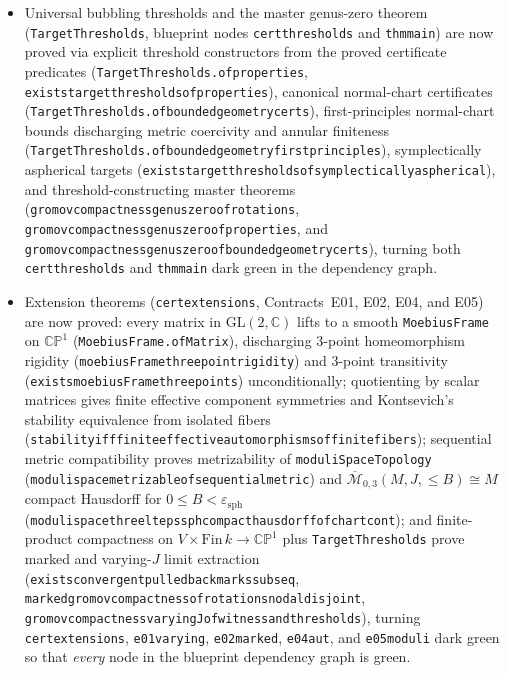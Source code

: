 \documentclass[11pt]{article}
\renewcommand{\_}{\origus\allowbreak}
\newcommand{\CP}{\mathbb{CP}^1}
\newcommand{\C}{\mathbb{C}}
\newcommand{\eps}{\varepsilon}
\newcommand{\code}[1]{\texttt{#1}}
\begin{document}
\begin{itemize}
  \code{isDefectSeq\_of\_concentration\_southern\_hemisphere}), and conformal M\"obius pullback
  pushforward (\code{weakMeasureConvergence\_map\_homeomorph},
  \code{concDefectCertificate\_of\_rotations}, \code{assemble\_prestable\_limit\_of\_rotations}, and
  \code{gromov\_compactness\_core\_of\_rotations}), turning \code{cert\_concdefect},
  \code{g01\_assemble}, and \code{g03\_core} dark green in the dependency graph.
\item Universal bubbling thresholds and the master genus-zero theorem (\code{TargetThresholds},
  blueprint nodes \code{cert\_thresholds} and \code{thm\_main}) are now proved via explicit threshold
  constructors from the proved certificate predicates (\code{TargetThresholds.of\_properties},
  \code{exists\_target\_thresholds\_of\_properties}), canonical normal-chart certificates
  (\code{TargetThresholds.of\_bounded\_geometry\_certs}), first-principles normal-chart bounds
  discharging metric coercivity and annular finiteness
  (\code{TargetThresholds.of\_bounded\_geometry\_first\_principles}), symplectically aspherical
  targets (\code{exists\_target\_thresholds\_of\_symplectically\_aspherical}), and threshold-constructing
  master theorems (\code{gromov\_compactness\_genus\_zero\_of\_rotations},
  \code{gromov\_compactness\_genus\_zero\_of\_properties}, and
  \code{gromov\_compactness\_genus\_zero\_of\_bounded\_geometry\_certs}), turning both
  \code{cert\_thresholds} and \code{thm\_main} dark green in the dependency graph.
\item Extension theorems (\code{cert\_extensions}, Contracts~E01, E02, E04, and E05) are now proved:
  every matrix in $\mathrm{GL}(2,\C)$ lifts to a smooth \code{MoebiusFrame} on $\CP$
  (\code{MoebiusFrame.ofMatrix}), discharging 3-point homeomorphism rigidity
  (\code{moebiusFrame\_three\_point\_rigidity}) and 3-point transitivity
  (\code{exists\_moebiusFrame\_three\_points}) unconditionally; quotienting by scalar matrices gives
  finite effective component symmetries and Kontsevich's stability equivalence from isolated fibers
  (\code{stability\_iff\_finite\_effective\_automorphisms\_of\_finite\_fibers}); sequential metric
  compatibility proves metrizability of \code{moduliSpaceTopology}
  (\code{moduli\_space\_metrizable\_of\_sequential\_metric}) and $\overline{\mathcal M}_{0,3}(M,J,\le B)\cong M$
  compact Hausdorff for $0\le B<\eps_{\mathrm{sph}}$
  (\code{moduli\_space\_three\_lt\_eps\_sph\_compact\_hausdorff\_of\_chart\_cont}); and finite-product
  compactness on $V\times\mathrm{Fin}\,k\to\CP$ plus \code{TargetThresholds} prove marked and
  varying-$J$ limit extraction (\code{exists\_convergent\_pulled\_back\_marks\_subseq},
  \code{marked\_gromov\_compactness\_of\_rotations\_nodal\_disjoint},
  \code{gromov\_compactness\_varying\_J\_of\_witness\_and\_thresholds}), turning
  \code{cert\_extensions}, \code{e01\_varying}, \code{e02\_marked}, \code{e04\_aut}, and
  \code{e05\_moduli} dark green so that \emph{every} node in the blueprint dependency graph is green.
\end{itemize}
\end{document}
